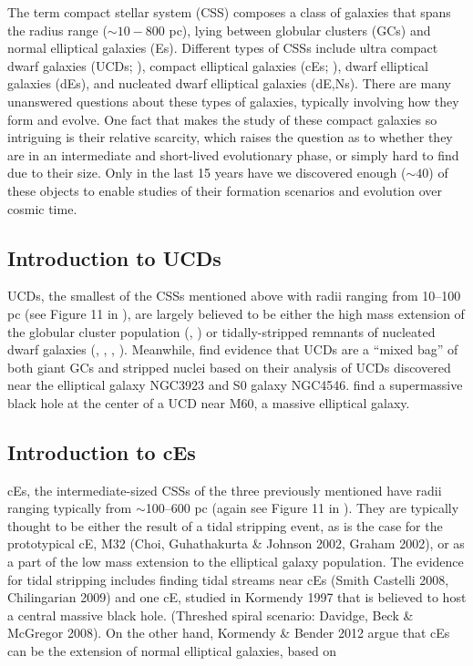 \documentclass[iop,apj,twocolappendix]{emulateapj}
\begin{document}
\noindent The term compact stellar system (CSS) composes a class of galaxies that spans the radius range ($\sim10 - 800$ pc), lying between globular clusters (GCs) and normal elliptical galaxies (Es). Different types of CSSs include ultra compact dwarf galaxies (UCDs; \citet{Phillipps2001}), compact elliptical galaxies (cEs; \citet{Faber1973}), dwarf elliptical galaxies (dEs), and nucleated dwarf elliptical galaxies (dE,Ns).  There are many unanswered questions about these types of galaxies, typically involving how they form and evolve. One fact that makes the study of these compact galaxies so intriguing is their relative scarcity, which raises the question as to whether they are in an intermediate and short-lived evolutionary phase, or simply hard to find due to their size. Only in the last 15 years have we discovered enough ($\sim 40$) of these objects to enable studies of their formation scenarios and evolution over cosmic time.

\subsection{Introduction to UCDs}
UCDs, the smallest of the CSSs mentioned above with radii ranging from 10--100 pc (see Figure 11 in \citet{Norris2014}), are largely believed to be either the high mass extension of the globular cluster population (\citet{Drinkwater2000}, \citet{Mieske2002}) or tidally-stripped remnants of nucleated dwarf galaxies (\citet{Bekki2001}, \citet{Bekki2003}, \citet{Jennings2015}, \citet{Zhang2015}). Meanwhile, \citet{Norris2011} find evidence that UCDs are a ``mixed bag'' of both giant GCs and stripped nuclei based on their analysis of UCDs discovered near the elliptical galaxy NGC3923 and S0 galaxy NGC4546. \citet{Seth2014} find a supermassive black hole at the center of a UCD near M60, a massive elliptical galaxy. 
 
 \subsection{Introduction to cEs}
cEs, the intermediate-sized CSSs of the three previously mentioned have radii ranging typically from $\sim$100--600 pc (again see Figure 11 in \citet{Norris2014}). They are typically thought to be either the result of a tidal stripping event, as is the case for the prototypical cE, M32 (Choi, Guhathakurta \& Johnson 2002, Graham 2002), or as a part of the low mass extension to the elliptical galaxy population. The evidence for tidal stripping includes finding tidal streams near cEs (Smith Castelli 2008, Chilingarian 2009) and one cE, studied in Kormendy 1997 that is believed to host a central massive black hole. (Threshed spiral scenario: Davidge, Beck \& McGregor 2008). On the other hand, Kormendy \& Bender 2012 argue that cEs can be the extension of normal elliptical galaxies, based on 
\end{document}
